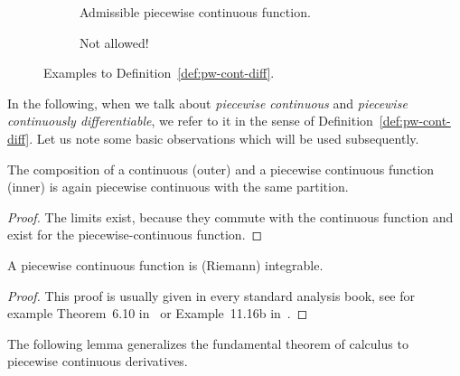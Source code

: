     \begin{figure}[t]\centering
        \begin{subfigure}[t]{0.48\textwidth}
            \centering
            
            \caption{Admissible piecewise continuous function.}
            \label{fig:allowed}
        \end{subfigure}
        \hfill
        \begin{subfigure}[t]{0.48\textwidth}
            \centering
            
            \caption{Not allowed!}
            \label{fig:not-allowed}
        \end{subfigure}
        \caption{Examples to Definition~\ref{def:pw-cont-diff}.}
    \end{figure}

    In the following, when we talk about \emph{piecewise continuous} and \emph{piecewise continuously differentiable}, we refer to it in the sense of Definition~\ref{def:pw-cont-diff}.
    Let us note some basic observations which will be used subsequently.

    \begin{lemma}\label{lm:comp-pw-cont}
        The composition of a continuous (outer) and a piecewise continuous function (inner) is again piecewise continuous with the same partition.
    \end{lemma}
    \begin{proof}
        The limits exist, because they commute with the continuous function and exist for the piecewise-continuous function.
    \end{proof}

    \begin{lemma}\label{lm:pc-integrable}
        A piecewise continuous function is (Riemann) integrable.
    \end{lemma}
    \begin{proof}
        This proof is usually given in every standard analysis book, see for example Theorem~6.10 in~\cite{Rudin76PrinciplesAnalysis} or Example~11.16b in~\cite{Gathmann12GDM}.
    \end{proof}

    The following lemma generalizes the fundamental theorem of calculus to piecewise continuous derivatives.

